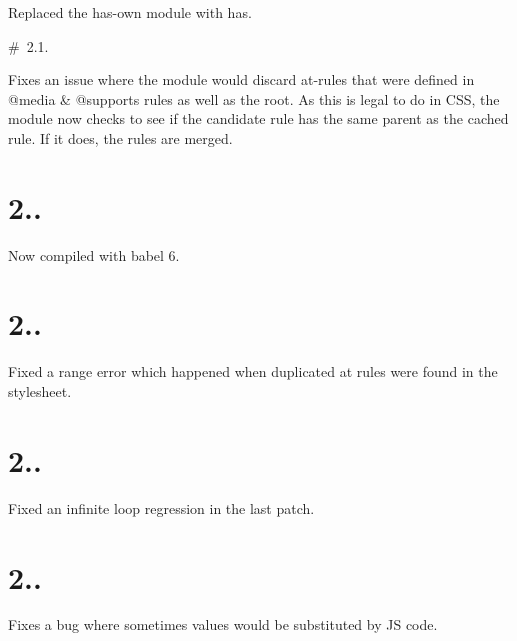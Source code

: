 
\begin{DoxyItemize}
\item Replaced the {\ttfamily has-\/own} module with {\ttfamily has}.
\end{DoxyItemize}

\# 2.1.


\begin{DoxyItemize}
\item Fixes an issue where the module would discard at-\/rules that were defined in {\ttfamily @media} \& {\ttfamily @supports} rules as well as the root. As this is legal to do in C\+SS, the module now checks to see if the candidate rule has the same parent as the cached rule. If it does, the rules are merged.
\end{DoxyItemize}

\section*{2..}


\begin{DoxyItemize}
\item Now compiled with babel 6.
\end{DoxyItemize}

\section*{2..}


\begin{DoxyItemize}
\item Fixed a range error which happened when duplicated at rules were found in the stylesheet.
\end{DoxyItemize}

\section*{2..}


\begin{DoxyItemize}
\item Fixed an infinite loop regression in the last patch.
\end{DoxyItemize}

\section*{2..}


\begin{DoxyItemize}
\item Fixes a bug where sometimes values would be substituted by JS code.
\end{DoxyItemize}

